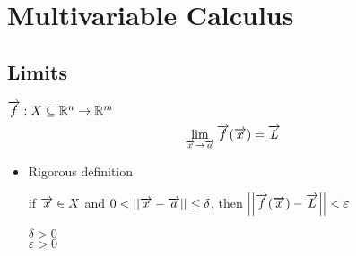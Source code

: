 \section{Multivariable Calculus}

\subsection{Limits}
	$\overrightarrow{f}: X \subseteq \mathbb{R}^n \rightarrow \mathbb{R}^m $
	\begin{equation}
		\lim_{\overrightarrow{x} \rightarrow \overrightarrow{a}} \overrightarrow{f} (\overrightarrow{x}) = \overrightarrow{L}
	\end{equation}
	\begin{itemize}
		\item Rigorous definition
			\begin{center}
				if $\overrightarrow{x} \in X$ and $0 < \left|\left| \overrightarrow{x} - \overrightarrow{a} \right|\right| \leq \delta $, then $ \left|\left|\overrightarrow{f} (\overrightarrow{x}) - \overrightarrow{L}\right|\right| < \varepsilon $
			\end{center}
			$\delta > 0$ \\
			$\varepsilon > 0$
	\end{itemize}